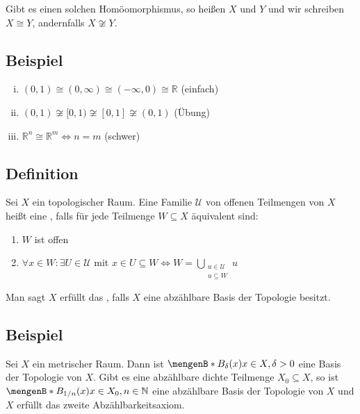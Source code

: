 Gibt es einen solchen Homöomorphismus, so heißen $X$ und $Y$  und wir schreiben $X \cong Y$, andernfalls $X \not\cong Y$.

\subsection[Beispiele für homöomorphe Mengen]{Beispiel} %
\label{sub:113}
\begin{enumerate}[(i)]
	\item $(0,1) \cong (0,\infty) \cong (-\infty,0) \cong \mathds{R}$ \hfill (einfach)
	\item $(0,1)\not\cong [0,1) \not\cong [0,1] \not\cong (0,1)$ \hfill (Übung)
	\item $\mathds{R}^n \cong \mathds{R}^m \iff n=m$ \hfill (schwer)
\end{enumerate}

\subsection[Definition: Basis der Topologie]{Definition} %
\label{sub:114}
Sei $X$ ein topologischer Raum. Eine Familie  $\mathcal{U}$ von offenen Teilmengen von $X$ heißt eine , falls für jede Teilmenge $W \subseteq X$
äquivalent sind:
\begin{enumerate}[(1)]
	\item $W$ ist offen
	\item $\forall x \in W  : \exists U \in \mathcal{U}$ mit $x \in U \subseteq  W \iff W = \bigcup_{\substack{u \in \mathcal{U}  \\ u \subseteq W}} u$ 
\end{enumerate}
Man sagt $X$ erfüllt das , falls $X$ eine abzählbare Basis der Topologie besitzt.

\subsection[Beispiel: Basis der Topologie in einem metrischen Raum]{Beispiel} %
\label{sub:115}
Sei $X$ ein metrischer Raum. Dann ist $\set[B_\delta (x)]{x \in X, \delta > 0} $ eine Basis der Topologie von $X$. Gibt es eine abzählbare dichte Teilmenge $X_0\subseteq X$,
so ist $\set[B_{1/n}(x)]{x \in X_0, n \in \mathds{N}} $ eine abzählbare Basis der Topologie von $X$ und $X$ erfüllt das zweite Abzählbarkeitsaxiom.

